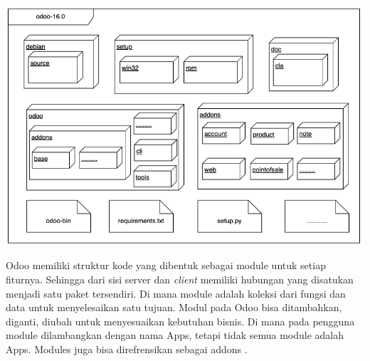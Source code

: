 \begin{center}
	\includegraphics[width=14cm]{img/bab_2/folder_odoo.png}
	\label{fig:asd}
\end{center}

Odoo memiliki struktur kode yang dibentuk sebagai module untuk setiap fiturnya. Sehingga dari sisi server dan \textit{client} memiliki hubungan yang disatukan menjadi satu paket tersendiri. Di mana module adalah koleksi dari fungsi dan data untuk menyelesaikan satu tujuan. Modul pada Odoo bisa ditambahkan, diganti, diubah untuk menyesuaikan kebutuhan bisnis. Di mana pada pengguna module dilambangkan dengan nama Apps, tetapi tidak semua module adalah Apps. Modules juga bisa direfrensikan sebagai addons \cite{odoo}. 

